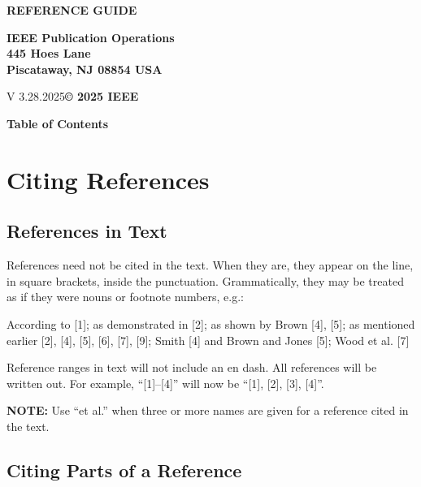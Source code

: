 \documentclass[10pt]{article}
\renewcommand{\thesubsection}{\Alph{subsection}}
\newcommand*{\subsectionlabel}{\thesubsection.}
\newcommand*{\guideindent}{\hspace*{14pt}}
\begin{document}
\begin{titlepage}
\centering
{\fontsize{25}{30}\bfseries\color{titleblue}REFERENCE GUIDE\par}
\vfill
\raggedright
{\fontsize{13}{15}\bfseries IEEE Publication Operations\\445 Hoes Lane\\Piscataway, NJ 08854 USA\par}
V 3.28.2025\hfill\textbf{\fontsize{13}{15}\selectfont\copyright{} 2025 IEEE}
\vspace*{10\baselineskip}
\end{titlepage}
\setcounter{page}{2}

{\centering\fontsize{18}{22}\bfseries Table of Contents\par}
\renewcommand{\contentsname}{}
\vspace*{-4ex}
{\setlength{\parskip}{0pt}\tableofcontents}
\clearpage

\renewcommand*{\subsectionlabel}{\hspace*{18pt}\textbf{\thesubsection.}}
\section{Citing References}

\subsection{References in Text}

\guideindent References need not be cited in the text. When they are, they appear on the line, in square brackets, inside the punctuation. Grammatically, they may be treated as if they were nouns or footnote numbers, e.g.:

{\leftskip=14pt According to [1]; as demonstrated in [2]; as shown by Brown [4], [5]; as mentioned earlier [2], [4], [5], [6], [7], [9]; Smith [4] and Brown and Jones [5]; Wood et al. [7]\par}

Reference ranges in text will not include an en dash. All references will be written out. For example, “[1]–[4]” will now be “[1], [2], [3], [4]”.

\guideindent\textbf{NOTE:} Use “et al.” when three or more names are given for a reference cited in the text.

\subsection{Citing Parts of a Reference}
\end{document}
